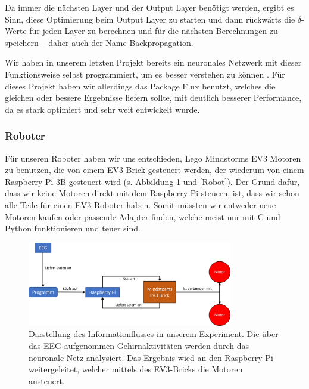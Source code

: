 \documentclass[11pt]{scrartcl}
\begin{document}
	Da immer die nächsten Layer und der Output Layer benötigt werden, ergibt es Sinn, diese Optimierung beim Output Layer zu starten und dann rückwärts die \mbox{$\delta$-Werte} für jeden Layer zu berechnen und für die nächsten Berechnungen zu speichern -- daher auch der Name Backpropagation. \cite{MITNeuronale} \cite{3b1b:nn} \cite{brotcrunsher:backwardpass}


	Wir haben in unserem letzten Projekt bereits ein neuronales Netzwerk mit dieser Funktionsweise selbst programmiert, um es besser verstehen zu können \cite{AIComposer}. Für dieses Projekt haben wir allerdings das Package Flux benutzt, welches die gleichen oder bessere Ergebnisse liefern sollte, mit deutlich besserer Performance, da es stark optimiert und sehr weit entwickelt wurde.

	\subsubsection{Roboter}

	Für unseren Roboter haben wir uns entschieden, Lego Mindstorms EV3 Motoren zu benutzen, die von einem EV3-Brick gesteuert werden, der wiederum von einem Raspberry Pi 3B gesteuert wird (s. Abbildung \ref{robot-funktion} und \ref{Robot}). Der Grund dafür, dass wir keine Motoren direkt mit dem Raspberry Pi steuern, ist, dass wir schon alle Teile für einen EV3 Roboter haben. Somit müssten wir entweder neue Motoren kaufen oder passende Adapter finden, welche meist nur mit C und Python funktionieren und teuer sind.

	\begin{figure}[H]
		\centering
		\includegraphics[width=0.8\textwidth]{pictures/roboter-funktionsweise.png}
		\caption{Darstellung des Informationflusses in unserem Experiment. Die über das EEG aufgenommen Gehirnaktivitäten werden durch das neuronale Netz analysiert. Das Ergebnis wied an den Raspberry Pi weitergeleitet, welcher mittels des EV3-Bricks die Motoren ansteuert.}
		\label{robot-funktion}
	\end{figure}
\end{document}
